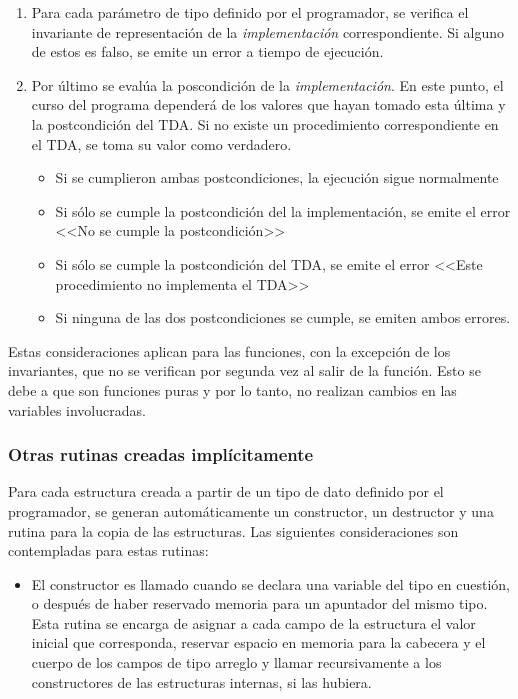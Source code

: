 {{\begin{enumerate}
  \item Para cada parámetro de tipo definido por el programador, se verifica el
  invariante de representación de la \textit{implementación} correspondiente. Si
  alguno de estos es falso, se emite un error a tiempo de ejecución.

  \item Por último se evalúa la poscondición de la \textit{implementación}. En
  este punto, el curso del programa dependerá de los valores que hayan tomado
  esta última y la postcondición del TDA. Si no existe un procedimiento
  correspondiente en el TDA, se toma su valor como verdadero.
    \begin{itemize}
      \item Si se cumplieron ambas postcondiciones, la ejecución sigue normalmente
      \item Si sólo se cumple la postcondición del la implementación, se emite el
      error <<No se cumple la postcondición>>
      \item Si sólo se cumple la postcondición del TDA, se emite el error <<Este
      procedimiento no implementa el TDA>>
      \item Si ninguna de las dos postcondiciones se cumple, se emiten ambos errores.
    \end{itemize}
\end{enumerate}

Estas consideraciones aplican para las funciones, con la excepción de los
invariantes, que no se verifican por segunda vez al salir de la función. Esto se
debe a que son funciones puras y por lo tanto, no realizan cambios en las
variables involucradas.

\subsubsection{Otras rutinas creadas implícitamente}

Para cada estructura creada a partir de un tipo de dato definido por el programador,
se generan automáticamente un constructor, un destructor y una rutina para la
copia de las estructuras. Las siguientes consideraciones son contempladas para
estas rutinas:

\begin{itemize}

  \item El constructor es llamado cuando se declara una variable del tipo en
  cuestión, o después de haber reservado memoria para un apuntador del mismo
  tipo. Esta rutina se encarga de asignar a cada campo de la estructura el
  valor inicial que corresponda, reservar espacio en memoria para la cabecera
  y el cuerpo de los campos de tipo arreglo y llamar recursivamente a los
  constructores de las estructuras internas, si las hubiera.


\end{itemize}}}
